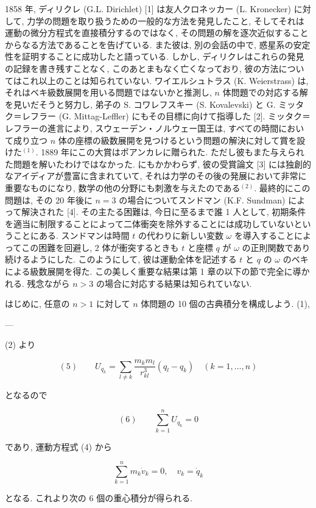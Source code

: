 \documentclass[dvipdfmx, leqno]{jsbook}
\begin{document}
1858 年, ディリクレ (G.L. Dirichlet) [1] は友人クロネッカー (L. Kronecker) に対して, 力学の問題を取り扱うための一般的な方法を発見したこと, そしてそれは運動の微分方程式を直接積分するのではなく, その問題の解を逐次近似することからなる方法であることを告げている. また彼は, 別の会話の中で, 惑星系の安定性を証明することに成功したと語っている. しかし, ディリクレはこれらの発見の記録を書き残すことなく, このあとまもなく亡くなっており, 彼の方法についてはこれ以上のことは知られていない. ワイエルシュトラス (K. Weierstrass) は, それはベキ級数展開を用いる問題ではないかと推測し, $n$ 体問題での対応する解を見いだそうと努力し, 弟子の S. コワレフスキー (S. Kovalevski) と G. ミッタク＝レフラー (G. Mittag-Leffler) にもその目標に向けて指導した [2]. ミッタク＝レフラーの進言により, スウェーデン・ノルウェー国王は, すべての時間において成り立つ $n$ 体の座標の級数展開を見つけるという問題の解決に対して賞を設けた$^{(1)}$. 1889 年にこの大賞はポアンカレに贈られた. ただし彼もまた与えられた問題を解いたわけではなかった. にもかかわらず, 彼の受賞論文 [3] には独創的なアイディアが豊富に含まれていて, それは力学のその後の発展において非常に重要なものになり, 数学の他の分野にも刺激を与えたのである$^{(2)}$. 最終的にこの問題は, その 20 年後に $n = 3$ の場合についてスンドマン (K.F. Sundman) によって解決された [4]. その主たる困難は, 今日に至るまで誰 1 人として, 初期条件を適当に制限することによって二体衝突を除外することには成功していないということにある. スンドマンは時間 $t$ の代わりに新しい変数 $\omega$ を導入することによってこの困難を回避し, 2 体が衝突するときも $t$ と座標 $q$ が $\omega$ の正則関数であり続けるようにした. このようにして, 彼は運動全体を記述する $t$ と $q$ の $\omega$ のベキによる級数展開を得た. この美しく重要な結果は第 1 章の以下の節で完全に導かれる. 残念ながら $n > 3$ の場合に対応する結果は知られていない.

はじめに, 任意の $n > 1$ に対して $n$ 体問題の 10 個の古典積分を構成しよう. (1),

---


(2) より

$$(5) \qquad U_{q_k} = \sum_{l \neq k} \frac{m_k m_l}{r_{kl}^3} (q_l - q_k) \quad (k=1,\dots,n)$$

となるので

$$(6) \qquad \sum_{k=1}^{n} U_{q_k} = 0$$

であり, 運動方程式 (4) から

$$\sum_{k=1}^{n} m_k \dot{v}_k = 0, \quad v_k = \dot{q}_k$$

となる. これより次の 6 個の重心積分が得られる.
\end{document}
